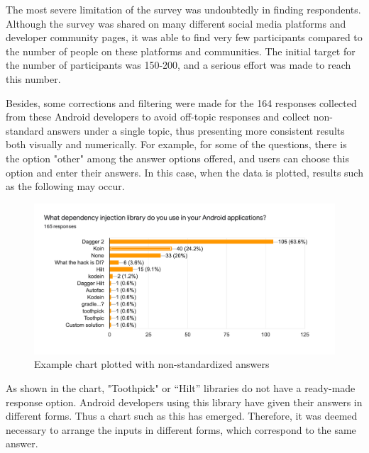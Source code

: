 The most severe limitation of the survey was undoubtedly in finding respondents. Although the survey was shared on many different social media platforms and developer community pages, it was able to find very few participants compared to the number of people on these platforms and communities. The initial target for the number of participants was 150-200, and a serious effort was made to reach this number.

Besides, some corrections and filtering were made for the 164 responses collected from these Android developers to avoid off-topic responses and collect non-standard answers under a single topic, thus presenting more consistent results both visually and numerically. For example, for some of the questions, there is the option "other" among the answer options offered, and users can choose this option and enter their answers. In this case, when the data is plotted, results such as the following may occur.
\begin{figure}[ht!]
    \centering
    \includegraphics[scale=0.20]{figures/survey_non_standard.png}
    \caption{Example chart plotted with non-standardized answers}
    \label{fig:non_standard_chart_example}
\end{figure}

As shown in the chart, "Toothpick" or “Hilt” libraries do not have a ready-made response option. Android developers using this library have given their answers in different forms. Thus a chart such as this has emerged. Therefore, it was deemed necessary to arrange the inputs in different forms, which correspond to the same answer. 

